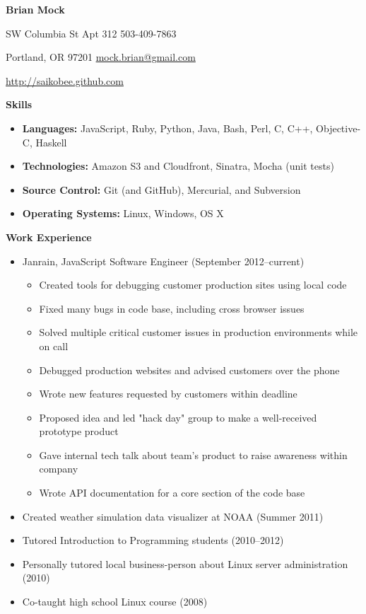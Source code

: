 \documentclass[10pt]{article}
\begin{document}
\noindent
\begin{center}
\textbf{\Large Brian Mock}
\end{center}

 SW Columbia St Apt 312
\hfill
503-409-7863

\noindent
Portland, OR 97201
\hfill
\url{mock.brian@gmail.com}

\noindent
\hfill
\url{http://saikobee.github.com}

\bigskip
\smallskip

\noindent \textbf{Skills} \hrulefill
\begin{itemize}
\item \textbf{Languages:} JavaScript, Ruby, Python, Java, Bash, Perl, C, C++, Objective-C, Haskell
\item \textbf{Technologies:} Amazon S3 and Cloudfront, Sinatra, Mocha
(unit tests)
\item \textbf{Source Control:} Git (and GitHub), Mercurial, and Subversion
\item \textbf{Operating Systems:} Linux, Windows, OS X
\end{itemize}

\medskip
\noindent \textbf{Work Experience} \hrulefill
\begin{itemize}
\item Janrain, JavaScript Software Engineer  (September 2012\---current)
    \begin{itemize}
    \item Created tools for debugging customer production sites using
    local code
    \item Fixed many bugs in code base, including cross browser issues
    \item Solved multiple critical customer issues in production
    environments while on call
    \item Debugged production websites and advised customers over the
    phone
    \item Wrote new features requested by customers within deadline
    \item Proposed idea and led "hack day" group to make a well-received
    prototype product
    \item Gave internal tech talk about team's product to raise
    awareness within company
    \item Wrote API documentation for a core section of the code base
    \end{itemize}
\item Created weather simulation data visualizer at NOAA (Summer 2011)
\item Tutored Introduction to Programming students (2010\---2012)
\item Personally tutored local business-person about Linux server
administration (2010)
\item Co-taught high school Linux course (2008)
\end{itemize}
\end{document}
